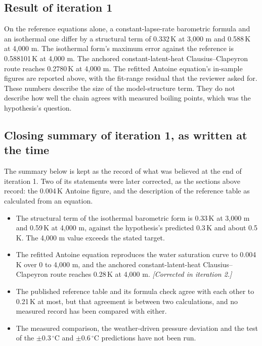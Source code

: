 \documentclass[11pt,letterpaper]{article}
\begin{document}
\subsection{Result of iteration 1}

On the reference equations alone, a constant-lapse-rate barometric formula and an isothermal one differ by a structural term of 0.332\,K at 3,000 m and 0.588\,K at 4,000 m. The isothermal form's maximum error against the reference is 0.588101\,K at 4,000 m. The anchored constant-latent-heat Clausius--Clapeyron route reaches 0.2780\,K at 4,000 m. The refitted Antoine equation's in-sample figures are reported above, with the fit-range residual that the reviewer asked for. These numbers describe the size of the model-structure term. They do not describe how well the chain agrees with measured boiling points, which was the hypothesis's question.

\subsection{Closing summary of iteration 1, as written at the time}

The summary below is kept as the record of what was believed at the end of iteration 1. Two of its statements were later corrected, as the sections above record: the 0.004\,K Antoine figure, and the description of the reference table as calculated from an equation.

\begin{itemize}
\item The structural term of the isothermal barometric form is 0.33\,K at 3,000 m and 0.59\,K at 4,000 m, against the hypothesis's predicted 0.3\,K and about 0.5\,K. The 4,000 m value exceeds the stated target.
\item The refitted Antoine equation reproduces the water saturation curve to 0.004\,K over 0 to 4,000 m, and the anchored constant-latent-heat Clausius--Clapeyron route reaches 0.28\,K at 4,000 m. \emph{[Corrected in iteration 2.]}
\item The published reference table and its formula check agree with each other to 0.21\,K at most, but that agreement is between two calculations, and no measured record has been compared with either.
\item The measured comparison, the weather-driven pressure deviation and the test of the $\pm 0.3$\,$^\circ$C and $\pm 0.6$\,$^\circ$C predictions have not been run.
\end{itemize}
\end{document}
